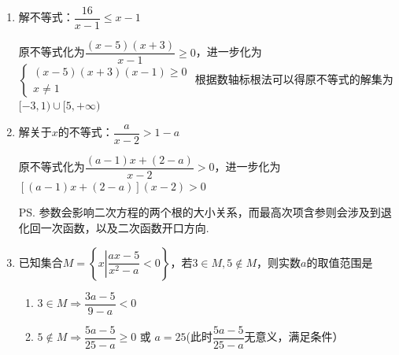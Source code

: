 \begin{enumerate}
    \item 解不等式：$\dfrac{16}{x-1} \leq x-1$
    \begin{jieda}
        原不等式化为$\dfrac{(x-5)(x+3)}{x-1} \geq 0$，进一步化为$\left \{\begin{array}{l}
             (x-5)(x+3)(x-1) \geq 0 \\
             x \neq 1
        \end{array} \right.$
        根据数轴标根法可以得原不等式的解集为$[-3,1) \cup [5, +\infty)$
    \end{jieda}
    \item 解关于$x$的不等式：$\dfrac{a}{x-2} > 1-a$
    \begin{jieda}
        原不等式化为$\dfrac{(a-1)x+(2-a)}{x-2} > 0$，进一步化为$[(a-1)x+(2-a)](x-2) > 0$ 
        \ps 参数会影响二次方程的两个根的大小关系，而最高次项含参则会涉及到退化回一次函数，以及二次函数开口方向.
    \end{jieda}
    \item 已知集合$M = \left\{x \left| \dfrac{ax- 5}{x^2-a} < 0\right. \right\}$，若$3 \in M, 5 \notin M$，则实数$a$的取值范围是
    \begin{jieda}
        \begin{enumerate}
            \item $3 \in M \Longrightarrow \dfrac{3a - 5}{9-a} < 0$
            \item $5 \notin M \Longrightarrow \dfrac{5a - 5}{25-a} \geq 0$ 或 $a = 25$(此时$\dfrac{5a - 5}{25-a}$无意义，满足条件）

\end{enumerate}
\end{jieda}
\end{enumerate}
